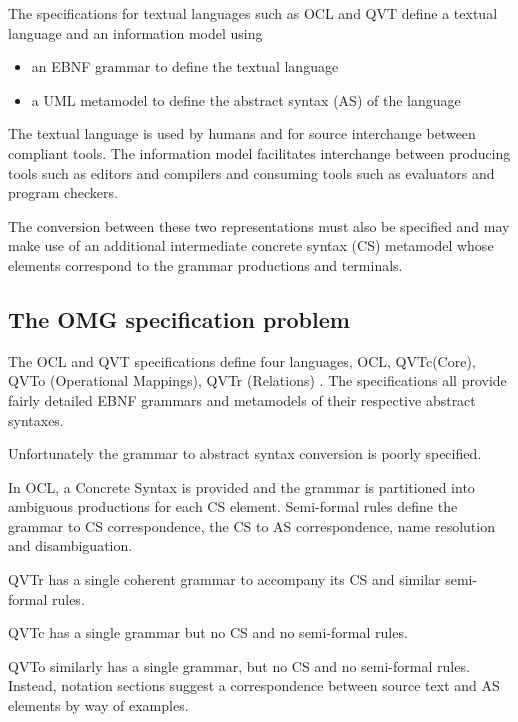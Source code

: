 \documentclass{llncs}
\begin{document}
The specifications for textual languages such as OCL and QVT define a textual language and an information model using
\begin{itemize}
\item an EBNF grammar to define the textual language
\item a UML metamodel to define the abstract syntax (AS) of the language
\end{itemize}
The textual language is used by humans and for source interchange between compliant tools. The information model facilitates interchange between producing tools such as editors and compilers and consuming tools such as evaluators and program checkers.

The conversion between these two representations must also be specified and may make use of an additional intermediate concrete syntax (CS) metamodel whose elements correspond to the grammar productions and terminals. 


\subsection{The OMG specification problem}

The OCL \cite{omg2013ocl} and QVT \cite{omg2014qvt} specifications define four languages, OCL, QVTc(Core), QVTo (Operational Mappings), QVTr (Relations)%
. The specifications all provide fairly detailed EBNF grammars and metamodels of their respective abstract syntaxes.

Unfortunately the grammar to abstract syntax conversion is poorly specified.

In OCL, a Concrete Syntax is provided and the grammar is partitioned into ambiguous productions for each CS element. Semi-formal rules define the grammar to CS correspondence, the CS to AS correspondence, name resolution and disambiguation.

QVTr has a single coherent grammar to accompany its CS and similar semi-formal rules.

QVTc has a single grammar but no CS and no semi-formal rules.

QVTo similarly has a single grammar, but no CS and no semi-formal rules. Instead, notation sections suggest a correspondence between source text and AS elements by way of examples. 
\end{document}
